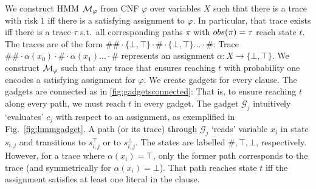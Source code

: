 \documentclass[runningheads]{llncs}
\begin{document}
We construct HMM $\mathcal{M}_\varphi$ from CNF $\varphi$ over variables $X$ such that there is a trace with risk $1$ iff there is a satisfying assignment to $\varphi$. In particular, that trace exists iff there is a trace $\tau$ s.t.\  all corresponding paths $\pi$ with ${obs}(\pi) = \tau$ reach state $t$.
The traces are of the form $\#\# \cdot \{ \bot, \top \} \cdot \# \cdot \{ \bot, \top \} \dots \cdot \#$: Trace $\#\# \cdot \alpha(x_0) \cdot \# \cdot \alpha(x_1) \dots \cdot \#$ represents an assignment  $\alpha\colon X \rightarrow \{\bot,\top \}$.
We construct $\mathcal{M}_\varphi$ such that any trace that ensures reaching $t$ with probability one encodes a satisfying assignment for $\varphi$.  We create gadgets for every clause. The gadgets are connected as in \cref{fig:gadgetsconnected}:
That is, to ensure reaching $t$ along every path, we must reach $t$ in every gadget.
The gadget $\mathcal{G}_j$ intuitively `evaluates' $c_j$ with respect to an assignment, as exemplified in Fig.~\ref{fig:hmmgadget}.
A path (or its trace) through $\mathcal{G}_j$ `reads' variable $x_i$ in state $s_{i,j}$ and transitions to $s_{i,j}^\top$ or to $s_{i,j}^\bot$. The states are labelled $\#, \top, \bot$, respectively. However, for a trace where $\alpha(x_i) = \top$, only the former path corresponds to the trace (and symmetrically for $\alpha(x_i) = \bot$). That path reaches state $t$ iff the assignment satisfies at least one literal in the clause.



%

%
\end{document}
